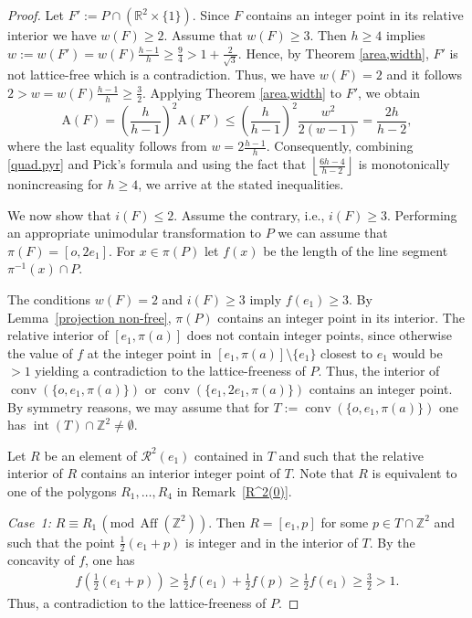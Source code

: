 \documentclass[a4paper]{article}
\theoremstyle{plain}
\begin{document}
\begin{proof} 
Let $F' := P \cap ({\mathbb{R}}^2 \times \{1\})$.
Since $F$ contains an integer point in its relative interior
we have $w(F) \geq 2$.
Assume that $w(F) \geq 3$.
Then $h \geq 4$ implies $w := w(F') = w(F) \frac{h-1}{h}
\geq \frac{9}{4} > 1 +\frac{2}{\sqrt{3}}$.
Hence, by Theorem \ref{area,width}, $F'$ is not lattice-free
which is a contradiction.
Thus, we have $w(F) = 2$ and it follows
$2 > w = w(F) \frac{h-1}{h} \geq \frac{3}{2}$.
Applying Theorem \ref{area,width} to $F'$, we obtain
\begin{equation} \label{quad.pyr}
  {\mathrm{A}}(F) = \left(\frac{h}{h-1}\right)^2 {\mathrm{A}}(F') \le
  \left(\frac{h}{h-1}\right)^2 \frac{w^2}{2(w-1)}
  = \frac{2h}{h-2},
\end{equation}
where the last equality follows from $w = 2 \frac{h-1}{h}$.
Consequently, combining \eqref{quad.pyr} and Pick's formula
and using the fact that ${\left\lfloor {\frac{6h-4}{h-2}} \right\rfloor}$ is
monotonically nonincreasing for $h \geq 4$, we arrive at the
stated inequalities.

We now show that $i(F) \le 2$.
Assume the contrary, i.e., $i(F) \ge 3$.
Performing an appropriate unimodular transformation to $P$
we can assume that $\pi(F) = [o,2 e_1]$.
For $x \in \pi(P)$ let $f(x)$ be the length of the line
segment $\pi^{-1}(x) \cap P$.

The conditions $w(F)=2$ and $i(F) \ge 3$ imply $f(e_1) \ge 3$. By Lemma~\ref{projection non-free}, $\pi(P)$ contains an
integer point in its interior. The relative interior of $[e_1,\pi(a)]$ does not contain integer points, since otherwise the value of $f$ at the integer point in $[e_1,\pi(a)] \setminus \{e_1\}$ closest to $e_1$ would be $>1$ yielding a contradiction to the lattice-freeness of $P$. Thus, the interior of ${{\mathop{\mathrm{{conv}}}}} (\{o,e_1,\pi(a)\})$ or ${{\mathop{\mathrm{{conv}}}}} (\{e_1, 2 e_1, \pi(a)\})$ contains an integer point. By symmetry reasons, we may assume that for $T:={{\mathop{\mathrm{{conv}}}}} (\{o,e_1, \pi(a)\})$ one has  ${{\mathop{\mathrm{{int}}}}} (T) \cap {\mathbb{Z}}^2 \ne \emptyset$.

Let $R$ be an element of ${\mathcal{R}}^2(e_1)$ contained in $T$ and such that the relative
interior of $R$ contains an interior integer point of
$T$.
Note that $R$ is equivalent to one of the polygons $R_1,
\ldots, R_4$ in Remark~\ref{R^2(0)}.

\emph{Case~1:} $R \equiv R_1 {\, (\mathrm{mod} \, {{{\mathop{\mathrm{{Aff}}}}}({\mathbb{Z}}^2)})}$.
Then $R=[e_1,p]$ for some $p \in T \cap {\mathbb{Z}}^2$ and such
that the point $\frac{1}{2}(e_1+p)$ is integer and in the
interior of $T$.
By the concavity of $f$, one has 
\begin{align*}
f \left( \frac{1}{2}(e_1+p) \right) \ge \frac{1}{2} f(e_1) +
\frac{1}{2} f(p) \ge \frac{1}{2} f(e_1) \ge \frac{3}{2}  > 1.
\end{align*}
Thus, a contradiction to the lattice-freeness of $P$.


\end{proof}
\end{document}
